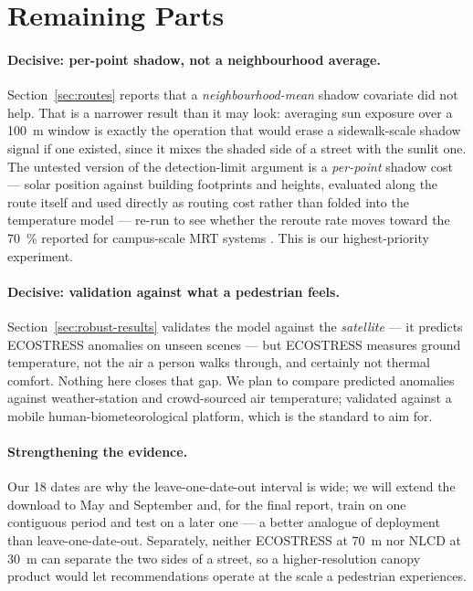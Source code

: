 \documentclass[10pt]{article}   %
\begin{document}
\section{Remaining Parts}
\label{sec:remaining}

\paragraph{Decisive: per-point shadow, not a neighbourhood average.}
Section~\ref{sec:routes} reports that a \emph{neighbourhood-mean} shadow covariate did not
help. That is a narrower result than it may look: averaging sun exposure over a
\SI{100}{\metre} window is exactly the operation that would erase a sidewalk-scale shadow
signal if one existed, since it mixes the shaded side of a street with the sunlit one. The
untested version of the detection-limit argument is a \emph{per-point} shadow cost --- solar
position against building footprints and heights, evaluated along the route itself and used
directly as routing cost rather than folded into the temperature model --- re-run to see
whether the reroute rate moves toward the \SI{70}{\percent} reported for campus-scale MRT
systems \citep{buo2026coolroutes}. This is our highest-priority experiment.

\paragraph{Decisive: validation against what a pedestrian feels.}
Section~\ref{sec:robust-results} validates the model against the \emph{satellite} --- it
predicts ECOSTRESS anomalies on unseen scenes --- but ECOSTRESS measures ground temperature,
not the air a person walks through, and certainly not thermal comfort. Nothing here closes
that gap. We plan to compare predicted anomalies against weather-station and crowd-sourced
air temperature; \citet{buo2026coolroutes} validated against a mobile
human-biometeorological platform, which is the standard to aim for.

\paragraph{Strengthening the evidence.}
Our 18 dates are why the leave-one-date-out interval is wide; we will extend the
download to May and September and, for the final report, train on one contiguous period and
test on a later one --- a better analogue of deployment than leave-one-date-out. Separately,
neither ECOSTRESS at \SI{70}{\metre} nor NLCD at \SI{30}{\metre} can separate the two sides
of a street, so a higher-resolution canopy product would let recommendations operate at the
scale a pedestrian experiences.
\end{document}
